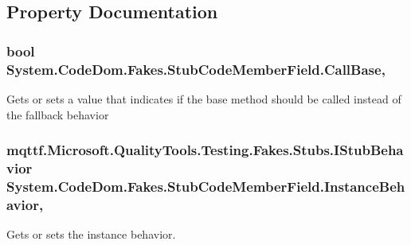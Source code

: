 \subsection{Property Documentation}
\hypertarget{class_system_1_1_code_dom_1_1_fakes_1_1_stub_code_member_field_a56f30366af374688f1c79f82e4df8496}{
\subsubsection[{Call\-Base}]{\setlength{\rightskip}{0pt plus 5cm}bool System.\-Code\-Dom.\-Fakes.\-Stub\-Code\-Member\-Field.\-Call\-Base\hspace{0.3cm}{\ttfamily [get]}, {\ttfamily [set]}}}\label{class_system_1_1_code_dom_1_1_fakes_1_1_stub_code_member_field_a56f30366af374688f1c79f82e4df8496}


Gets or sets a value that indicates if the base method should be called instead of the fallback behavior

\hypertarget{class_system_1_1_code_dom_1_1_fakes_1_1_stub_code_member_field_aec3f3d7c4a97899febafae05005fe14f}{
\subsubsection[{Instance\-Behavior}]{\setlength{\rightskip}{0pt plus 5cm}mqttf.\-Microsoft.\-Quality\-Tools.\-Testing.\-Fakes.\-Stubs.\-I\-Stub\-Behavior System.\-Code\-Dom.\-Fakes.\-Stub\-Code\-Member\-Field.\-Instance\-Behavior\hspace{0.3cm}{\ttfamily [get]}, {\ttfamily [set]}}}\label{class_system_1_1_code_dom_1_1_fakes_1_1_stub_code_member_field_aec3f3d7c4a97899febafae05005fe14f}


Gets or sets the instance behavior.

